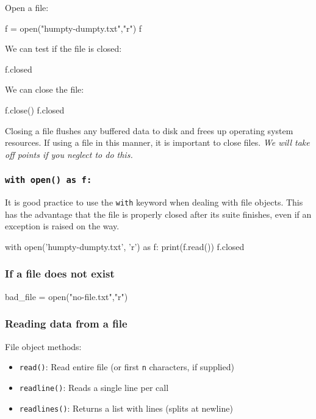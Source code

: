 \documentclass[12pt]{article} \newif\ifsolution\solutiontrue %
\begin{document}
Open a file:

\begin{python}
f = open("humpty-dumpty.txt","r") f
\end{python}

We can test if the file is closed:

\begin{python}
f.closed
\end{python}

We can close the file:

\begin{python}
f.close() f.closed
\end{python}

Closing a file flushes any buffered data to disk and frees up operating
system resources. If using a file in this manner, it is important to
close files. \emph{We will take off points if you neglect to do this.}

\subsubsection{\texorpdfstring{\texttt{with\ open()\ as\ f:}}{with open() as f:}}\label{with-open-as-f}

It is good practice to use the \texttt{with} keyword when dealing with
file objects. This has the advantage that the file is properly closed
after its suite finishes, even if an exception is raised on the way.

\begin{python}
with open('humpty-dumpty.txt', 'r') as f:     print(f.read())
f.closed
\end{python}

\subsubsection{If a file does not exist}\label{if-a-file-does-not-exist}

\begin{python}
bad_file = open("no-file.txt","r")
\end{python}

\subsubsection{Reading data from a file}\label{reading-data-from-a-file}

File object methods:

\begin{itemize}
\item
  \texttt{read()}: Read entire file (or first \texttt{n} characters, if
  supplied)
\item
  \texttt{readline()}: Reads a single line per call
\item
  \texttt{readlines()}: Returns a list with lines (splits at newline)
\end{itemize}
\end{document}
